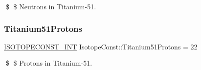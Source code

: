 \$ \$ Neutrons in Titanium-\/51. \mbox{\label{group___isotope_const-_titanium-_ti51_ga9341ddfe0d1ba7dfb6d95bedcfc119d8}} 
\subsubsection{\texorpdfstring{Titanium51\+Protons}{Titanium51Protons}}
{\footnotesize\ttfamily \mbox{\hyperlink{group___isotope_const-_macros_ga5f18360b3e99483a35c32d789e62621c}{I\+S\+O\+T\+O\+P\+E\+C\+O\+N\+S\+T\+\_\+\+I\+NT}} Isotope\+Const\+::\+Titanium51\+Protons = 22}

\$ \$ Protons in Titanium-\/51. 